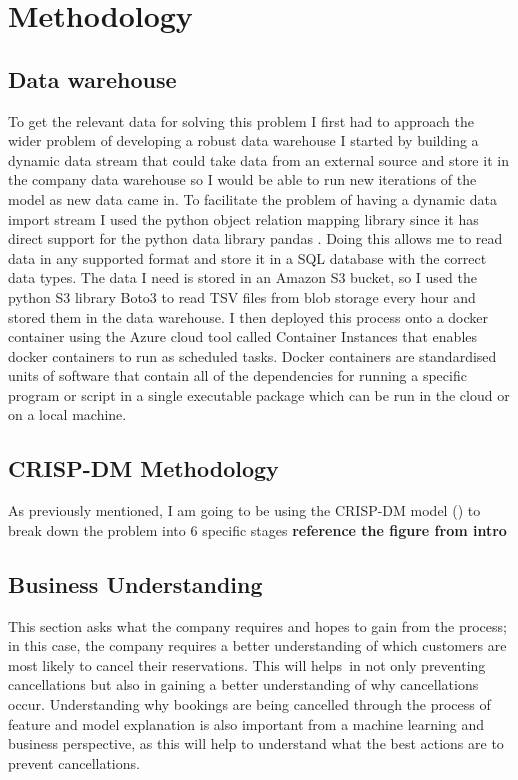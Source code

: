 \chapter{Methodology}
\label{ch:method}

\section{Data warehouse}
To get the relevant data for solving this problem I first had to approach the wider problem of developing a robust data warehouse I started by building a dynamic data stream that could take data from an external source and store it in the company data warehouse so I would be able to run new iterations of the model as new data came in. To facilitate the problem of having a dynamic data import stream I used the python object relation mapping library since it has direct support for the python data library pandas . Doing this allows me to read data in any supported format and store it in a SQL database with the correct data types. The data I need is stored in an Amazon S3 bucket, so I used the python S3 library Boto3 to read TSV files from blob storage every hour and stored them in the data warehouse. I then deployed this process onto a docker container using the Azure cloud tool called Container Instances that enables docker containers to run as scheduled tasks. Docker containers are standardised units of software that contain all of the dependencies for running a specific program or script in a single executable package which can be run in the cloud or on a local machine.

\section{CRISP-DM Methodology}

As previously mentioned, I am going to be using the CRISP-DM model (\cite{Wirth2000CRISP-DMMining}) to break down the problem into 6 specific stages \textbf{reference the figure from intro} 

\section{Business Understanding}

This section asks what the company requires and hopes to gain from the process; in this case, the company requires a better understanding of which customers are most likely to cancel their reservations. This will helps in not only preventing cancellations but also in gaining a better understanding of why cancellations occur. Understanding why bookings are being cancelled through the process of feature and model explanation is also important from a machine learning and business perspective, as this will help to understand what the best actions are to prevent cancellations.

